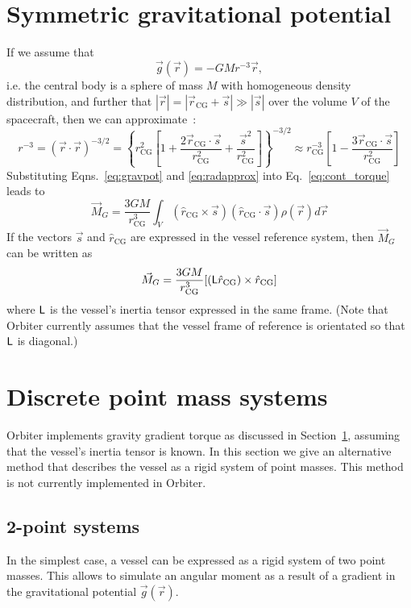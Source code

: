 \documentclass[a4paper]{article}
\begin{document}
\section{Symmetric gravitational potential}\label{sec:sympot}
If we assume that
\begin{equation}\label{eq:gravpot}
\vec{g}(\vec{r}) = -GMr^{-3}\vec{r},
\end{equation}
i.e. the central body is a sphere of mass $M$ with homogeneous density distribution, and further that $|\vec{r}| = |\vec{r}_\text{CG} + \vec{s}| \gg |\vec{s}|$ over the volume $V$ of the spacecraft, then we can approximate~\cite{wertz1978}:
\begin{equation}\label{eq:radapprox}
r^{-3} = (\vec{r}\cdot\vec{r})^{-3/2} =
\left\{ r_\text{CG}^2 \left[ 1 + \frac{2\vec{r}_\text{CG}\cdot\vec{s}}{r_\text{CG}^2} + \frac{\vec{s}^2}{r_\text{CG}^2} \right] \right\}^{-3/2} \approx
r_\text{CG}^{-3} \left[ 1 - \frac{3 \vec{r}_\text{CG}\cdot\vec{s}}{r_\text{CG}^2} \right]
\end{equation}
Substituting Eqns.~\ref{eq:gravpot} and \ref{eq:radapprox} into Eq.~\ref{eq:cont_torque} leads to
\begin{equation}
\vec{M}_G = \frac{3GM}{r_\text{CG}^3} \int_V (\hat{r}_\text{CG} \times \vec{s}) (\hat{r}_\text{CG} \cdot \vec{s}) \rho(\vec{r}) d\vec{r}
\end{equation}
If the vectors $\vec{s}$ and $\hat{r}_\text{CG}$ are expressed in the vessel reference system, then $\vec{M}_G$ can be written as
\begin{equation}
\vec{M}_G = \frac{3GM}{r_\text{CG}^3} [(\mathsf{L}\hat{r}_\text{CG}) \times \hat{r}_\text{CG}]
\end{equation}
where $\mathsf{L}$ is the vessel's inertia tensor expressed in the same frame. (Note that Orbiter currently assumes that the vessel frame of reference is orientated so that $\mathsf{L}$ is diagonal.)


\section{Discrete point mass systems}
Orbiter implements gravity gradient torque as discussed in Section~\ref{sec:sympot}, assuming that the vessel's inertia tensor is known. In this section we give an alternative method that describes the vessel as a rigid system of point masses. This method is not currently implemented in Orbiter.

\subsection{2-point systems}
In the simplest case, a vessel can be expressed as a rigid system of two point masses. This allows to simulate an angular moment as a result of a gradient in the gravitational potential $\vec{g}(\vec{r})$.
\end{document}
